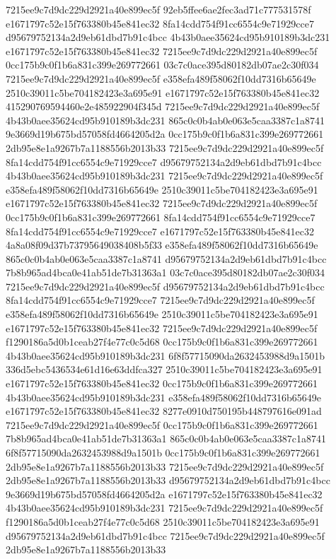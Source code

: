 7215ee9c7d9dc229d2921a40e899ec5f
92eb5ffee6ae2fec3ad71c777531578f
e1671797c52e15f763380b45e841ec32
8fa14cdd754f91cc6554c9e71929cce7
d95679752134a2d9eb61dbd7b91c4bcc
4b43b0aee35624cd95b910189b3dc231
e1671797c52e15f763380b45e841ec32
7215ee9c7d9dc229d2921a40e899ec5f
0cc175b9c0f1b6a831c399e269772661
03c7c0ace395d80182db07ae2c30f034
7215ee9c7d9dc229d2921a40e899ec5f
e358efa489f58062f10dd7316b65649e
2510c39011c5be704182423e3a695e91
e1671797c52e15f763380b45e841ec32
415290769594460e2e485922904f345d
7215ee9c7d9dc229d2921a40e899ec5f
4b43b0aee35624cd95b910189b3dc231
865c0c0b4ab0e063e5caa3387c1a8741
9e3669d19b675bd57058fd4664205d2a
0cc175b9c0f1b6a831c399e269772661
2db95e8e1a9267b7a1188556b2013b33
7215ee9c7d9dc229d2921a40e899ec5f
8fa14cdd754f91cc6554c9e71929cce7
d95679752134a2d9eb61dbd7b91c4bcc
4b43b0aee35624cd95b910189b3dc231
7215ee9c7d9dc229d2921a40e899ec5f
e358efa489f58062f10dd7316b65649e
2510c39011c5be704182423e3a695e91
e1671797c52e15f763380b45e841ec32
7215ee9c7d9dc229d2921a40e899ec5f
0cc175b9c0f1b6a831c399e269772661
8fa14cdd754f91cc6554c9e71929cce7
8fa14cdd754f91cc6554c9e71929cce7
e1671797c52e15f763380b45e841ec32
4a8a08f09d37b73795649038408b5f33
e358efa489f58062f10dd7316b65649e
865c0c0b4ab0e063e5caa3387c1a8741
d95679752134a2d9eb61dbd7b91c4bcc
7b8b965ad4bca0e41ab51de7b31363a1
03c7c0ace395d80182db07ae2c30f034
7215ee9c7d9dc229d2921a40e899ec5f
d95679752134a2d9eb61dbd7b91c4bcc
8fa14cdd754f91cc6554c9e71929cce7
7215ee9c7d9dc229d2921a40e899ec5f
e358efa489f58062f10dd7316b65649e
2510c39011c5be704182423e3a695e91
e1671797c52e15f763380b45e841ec32
7215ee9c7d9dc229d2921a40e899ec5f
f1290186a5d0b1ceab27f4e77c0c5d68
0cc175b9c0f1b6a831c399e269772661
4b43b0aee35624cd95b910189b3dc231
6f8f57715090da2632453988d9a1501b
336d5ebc5436534e61d16e63ddfca327
2510c39011c5be704182423e3a695e91
e1671797c52e15f763380b45e841ec32
0cc175b9c0f1b6a831c399e269772661
4b43b0aee35624cd95b910189b3dc231
e358efa489f58062f10dd7316b65649e
e1671797c52e15f763380b45e841ec32
8277e0910d750195b448797616e091ad
7215ee9c7d9dc229d2921a40e899ec5f
0cc175b9c0f1b6a831c399e269772661
7b8b965ad4bca0e41ab51de7b31363a1
865c0c0b4ab0e063e5caa3387c1a8741
6f8f57715090da2632453988d9a1501b
0cc175b9c0f1b6a831c399e269772661
2db95e8e1a9267b7a1188556b2013b33
7215ee9c7d9dc229d2921a40e899ec5f
2db95e8e1a9267b7a1188556b2013b33
d95679752134a2d9eb61dbd7b91c4bcc
9e3669d19b675bd57058fd4664205d2a
e1671797c52e15f763380b45e841ec32
4b43b0aee35624cd95b910189b3dc231
7215ee9c7d9dc229d2921a40e899ec5f
f1290186a5d0b1ceab27f4e77c0c5d68
2510c39011c5be704182423e3a695e91
d95679752134a2d9eb61dbd7b91c4bcc
7215ee9c7d9dc229d2921a40e899ec5f
2db95e8e1a9267b7a1188556b2013b33
